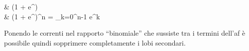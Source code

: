 		\begin{esp}
			& (1 + e^{\jmath \psi})  \\
			& \implies (1 + e^{\jmath \psi})^n = 
				\sum_{k=0}^{n-1}  e^{\jmath k \psi} 
		\end{esp}

		Ponendo le correnti nel rapporto ``binomiale'' che sussiste tra i termini dell'\gls{af} è possibile quindi sopprimere completamente i lobi secondari.
